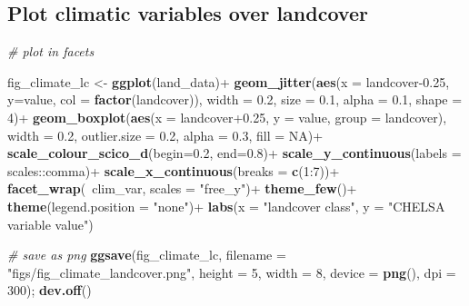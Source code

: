 \documentclass[]{article}
\newenvironment{Shaded}{}{}
\newcommand{\CommentTok}[1]{\textcolor[rgb]{0.38,0.63,0.69}{\textit{#1}}}
\newcommand{\DataTypeTok}[1]{\textcolor[rgb]{0.56,0.13,0.00}{#1}}
\newcommand{\DecValTok}[1]{\textcolor[rgb]{0.25,0.63,0.44}{#1}}
\newcommand{\FloatTok}[1]{\textcolor[rgb]{0.25,0.63,0.44}{#1}}
\newcommand{\KeywordTok}[1]{\textcolor[rgb]{0.00,0.44,0.13}{\textbf{#1}}}
\newcommand{\NormalTok}[1]{#1}
\newcommand{\OperatorTok}[1]{\textcolor[rgb]{0.40,0.40,0.40}{#1}}
\newcommand{\OtherTok}[1]{\textcolor[rgb]{0.00,0.44,0.13}{#1}}
\newcommand{\StringTok}[1]{\textcolor[rgb]{0.25,0.44,0.63}{#1}}
\begin{document}
\hypertarget{plot-climatic-variables-over-landcover}{%
\subsection{Plot climatic variables over landcover}\label{plot-climatic-variables-over-landcover}}

\begin{Shaded}
\begin{Highlighting}[]
\CommentTok{# plot in facets}

\NormalTok{fig_climate_lc <-}\StringTok{ }\KeywordTok{ggplot}\NormalTok{(land_data)}\OperatorTok{+}
\StringTok{  }\KeywordTok{geom_jitter}\NormalTok{(}\KeywordTok{aes}\NormalTok{(}\DataTypeTok{x =}\NormalTok{ landcover}\FloatTok{-0.25}\NormalTok{, }\DataTypeTok{y=}\NormalTok{value,}
                  \DataTypeTok{col =} \KeywordTok{factor}\NormalTok{(landcover)),}
              \DataTypeTok{width =} \FloatTok{0.2}\NormalTok{,}
              \DataTypeTok{size =} \FloatTok{0.1}\NormalTok{, }\DataTypeTok{alpha =} \FloatTok{0.1}\NormalTok{, }\DataTypeTok{shape =} \DecValTok{4}\NormalTok{)}\OperatorTok{+}
\StringTok{  }\KeywordTok{geom_boxplot}\NormalTok{(}\KeywordTok{aes}\NormalTok{(}\DataTypeTok{x =}\NormalTok{ landcover}\FloatTok{+0.25}\NormalTok{, }\DataTypeTok{y =}\NormalTok{ value, }\DataTypeTok{group =}\NormalTok{ landcover),}
               \DataTypeTok{width =} \FloatTok{0.2}\NormalTok{,}
               \DataTypeTok{outlier.size =} \FloatTok{0.2}\NormalTok{, }\DataTypeTok{alpha =} \FloatTok{0.3}\NormalTok{, }\DataTypeTok{fill =} \OtherTok{NA}\NormalTok{)}\OperatorTok{+}
\StringTok{  }\KeywordTok{scale_colour_scico_d}\NormalTok{(}\DataTypeTok{begin=}\FloatTok{0.2}\NormalTok{, }\DataTypeTok{end=}\FloatTok{0.8}\NormalTok{)}\OperatorTok{+}
\StringTok{  }\KeywordTok{scale_y_continuous}\NormalTok{(}\DataTypeTok{labels =}\NormalTok{ scales}\OperatorTok{::}\NormalTok{comma)}\OperatorTok{+}
\StringTok{  }\KeywordTok{scale_x_continuous}\NormalTok{(}\DataTypeTok{breaks =} \KeywordTok{c}\NormalTok{(}\DecValTok{1}\OperatorTok{:}\DecValTok{7}\NormalTok{))}\OperatorTok{+}
\StringTok{  }\KeywordTok{facet_wrap}\NormalTok{(}\OperatorTok{~}\NormalTok{clim_var, }\DataTypeTok{scales =} \StringTok{"free_y"}\NormalTok{)}\OperatorTok{+}
\StringTok{  }\KeywordTok{theme_few}\NormalTok{()}\OperatorTok{+}
\StringTok{  }\KeywordTok{theme}\NormalTok{(}\DataTypeTok{legend.position =} \StringTok{"none"}\NormalTok{)}\OperatorTok{+}
\StringTok{  }\KeywordTok{labs}\NormalTok{(}\DataTypeTok{x =} \StringTok{"landcover class"}\NormalTok{, }\DataTypeTok{y =} \StringTok{"CHELSA variable value"}\NormalTok{)}

\CommentTok{# save as png}
\KeywordTok{ggsave}\NormalTok{(fig_climate_lc, }\DataTypeTok{filename =} \StringTok{"figs/fig_climate_landcover.png"}\NormalTok{, }
       \DataTypeTok{height =} \DecValTok{5}\NormalTok{, }\DataTypeTok{width =} \DecValTok{8}\NormalTok{, }\DataTypeTok{device =} \KeywordTok{png}\NormalTok{(), }\DataTypeTok{dpi =} \DecValTok{300}\NormalTok{); }\KeywordTok{dev.off}\NormalTok{()}
\end{Highlighting}
\end{Shaded}
\end{document}
